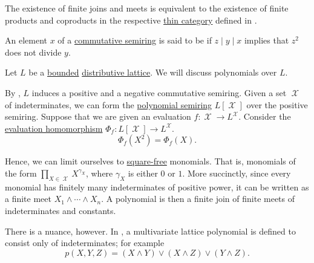 \begin{remark}\label{rem:lattice_categorical_product}
  The existence of finite joins and meets is equivalent to the existence of finite products and coproducts in the respective \hyperref[def:thin_category]{thin category} defined in .
\end{remark}

\begin{definition}\label{def:square_free}
  An element \( x \) of a \hyperref[def:semiring/commutative]{commutative semiring} is said to be  if \( z \mid y \mid x \) implies that \( z^2 \) does not divide \( y \).
\end{definition}

\begin{remark}\label{rem:lattice_polynomial_semiring}
  Let \( L \) be a \hyperref[def:semilattice/bounded]{bounded} \hyperref[def:semilattice/distributive_lattice]{distributive lattice}. We will discuss polynomials over \( L \).

  By , \( L \) induces a positive and a negative commutative semiring. Given a set \( \mscrX \) of indeterminates, we can form the \hyperref[def:polynomial_semiring]{polynomial semiring} \( L[\mscrX] \) over the positive semiring. Suppose that we are given an evaluation \( f: \mscrX \to L^\mscrX \). Consider the \hyperref[thm:polynomial_semiring_universal_property]{evaluation homomorphism} \( \Phi_f: L[\mscrX] \to L^\mscrX \).
  \begin{equation*}
    \Phi_f(X^2) = \Phi_f(X).
  \end{equation*}

  Hence, we can limit ourselves to \hyperref[def:square_free]{square-free} monomials. That is, monomials of the form \( \prod_{X \in \mscrX} X^{\gamma_X} \), where \( \gamma_X \) is either \( 0 \) or \( 1 \). More succinctly, since every monomial has finitely many indeterminates of positive power, it can be written as a finite meet \( X_1 \wedge \cdots \wedge X_n \). A polynomial is then a finite join of finite meets of indeterminates and constants.

  There is a nuance, however. In \cite[def. I.4.2]{Gratzer1978}, a multivariate lattice polynomial is defined to consist only of indeterminates; for example
  \begin{equation*}
    p(X, Y, Z) = (X \wedge Y) \vee (X \wedge Z) \vee (Y \wedge Z).
  \end{equation*}


\end{remark}
